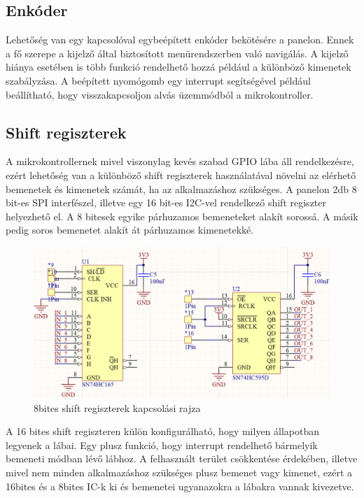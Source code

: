 \subsection{Enkóder}
Lehetőség van egy kapcsolóval egybeépített enkóder bekötésére a panelon. Ennek a fő szerepe a kijelző által biztosított menürendszerben való navigálás. A kijelző hiánya esetében is több funkció rendelhető hozzá például a különböző kimenetek szabályzása. A beépített nyomógomb egy interrupt segítségével például beállítható, hogy visszakapcsoljon alvás üzemmódból a mikrokontroller.


\subsection{Shift regiszterek}
A mikrokontrollernek mivel viszonylag kevés szabad GPIO lába áll rendelkezésre, ezért lehetőség van a különböző shift regiszterek használatával növelni az elérhető bemenetek és kimenetek számát, ha az alkalmazáshoz szükséges. A panelon 2db 8 bit-es SPI interfészel, illetve egy 16 bit-es I2C-vel rendelkező shift regiszter helyezhető el. A 8 bitesek egyike párhuzamos bemeneteket alakít sorossá. A másik pedig soros bemenetet alakít át párhuzamos kimenetekké. 
\begin{figure}[!ht]
    \centering
    \includegraphics[width=140mm, keepaspectratio]{figures/8bit_shift_registers.png}
    \caption{8bites shift regiszterek kapcsolási rajza}
    \label{fig:TeXstudio}
\end{figure}
A 16 bites shift regiszteren külön konfigurálható, hogy milyen állapotban legyenek a lábai. Egy plusz funkció, hogy interrupt rendelhető bármelyik bemeneti módban lévő lábhoz. A felhasznált terület csökkentése érdekében, illetve mivel nem minden alkalmazáshoz szükséges plusz bemenet vagy kimenet, ezért a 16bites és a 8bites IC-k ki és bemenetei ugyanazokra a lábakra vannak kivezetve.
